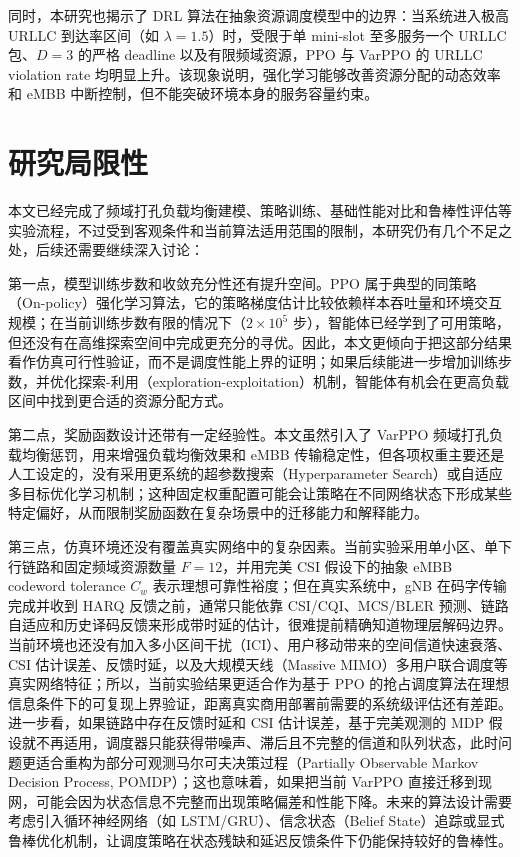 同时，本研究也揭示了 DRL 算法在抽象资源调度模型中的边界：当系统进入极高 URLLC 到达率区间（如 \(\lambda=1.5\)）时，受限于单 mini-slot 至多服务一个 URLLC 包、\(D=3\) 的严格 deadline 以及有限频域资源，PPO 与 VarPPO 的 URLLC violation rate 均明显上升。该现象说明，强化学习能够改善资源分配的动态效率和 eMBB 中断控制，但不能突破环境本身的服务容量约束。

\section{研究局限性}\label{52-ux7814ux7a76ux5c40ux9650ux6027}

本文已经完成了频域打孔负载均衡建模、策略训练、基础性能对比和鲁棒性评估等实验流程，不过受到客观条件和当前算法适用范围的限制，本研究仍有几个不足之处，后续还需要继续深入讨论：

第一点，模型训练步数和收敛充分性还有提升空间。PPO 属于典型的同策略（On-policy）强化学习算法，它的策略梯度估计比较依赖样本吞吐量和环境交互规模；在当前训练步数有限的情况下（\(2 \times 10^5\) 步），智能体已经学到了可用策略，但还没有在高维探索空间中完成更充分的寻优。因此，本文更倾向于把这部分结果看作仿真可行性验证，而不是调度性能上界的证明；如果后续能进一步增加训练步数，并优化探索-利用（exploration-exploitation）机制，智能体有机会在更高负载区间中找到更合适的资源分配方式。

第二点，奖励函数设计还带有一定经验性。本文虽然引入了 VarPPO 频域打孔负载均衡惩罚，用来增强负载均衡效果和 eMBB 传输稳定性，但各项权重主要还是人工设定的，没有采用更系统的超参数搜索（Hyperparameter Search）或自适应多目标优化学习机制；这种固定权重配置可能会让策略在不同网络状态下形成某些特定偏好，从而限制奖励函数在复杂场景中的迁移能力和解释能力。

第三点，仿真环境还没有覆盖真实网络中的复杂因素。当前实验采用单小区、单下行链路和固定频域资源数量 \(F=12\)，并用完美 CSI 假设下的抽象 eMBB codeword tolerance \(C_w\) 表示理想可靠性裕度；但在真实系统中，gNB 在码字传输完成并收到 HARQ 反馈之前，通常只能依靠 CSI/CQI、MCS/BLER 预测、链路自适应和历史译码反馈来形成带时延的估计，很难提前精确知道物理层解码边界。当前环境也还没有加入多小区间干扰（ICI）、用户移动带来的空间信道快速衰落、CSI 估计误差、反馈时延，以及大规模天线（Massive MIMO）多用户联合调度等真实网络特征；所以，当前实验结果更适合作为基于 PPO 的抢占调度算法在理想信息条件下的可复现上界验证，距离真实商用部署前需要的系统级评估还有差距。进一步看，如果链路中存在反馈时延和 CSI 估计误差，基于完美观测的 MDP 假设就不再适用，调度器只能获得带噪声、滞后且不完整的信道和队列状态，此时问题更适合重构为部分可观测马尔可夫决策过程（Partially Observable Markov Decision Process, POMDP）；这也意味着，如果把当前 VarPPO 直接迁移到现网，可能会因为状态信息不完整而出现策略偏差和性能下降。未来的算法设计需要考虑引入循环神经网络（如 LSTM/GRU）、信念状态（Belief State）追踪或显式鲁棒优化机制，让调度策略在状态残缺和延迟反馈条件下仍能保持较好的鲁棒性。

